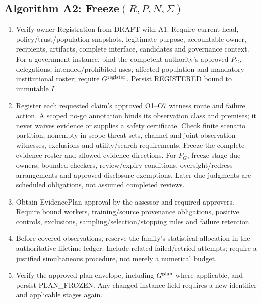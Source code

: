 \subsection{Algorithm A2: Freeze$(R,P,N,\Sigma)$}
\begin{enumerate}
\item Verify owner Registration from DRAFT with A1. Require current head,
policy/trust/population snapshots, legitimate purpose, accountable owner,
recipients, artifacts, complete interface, candidates and governance context.
For a government instance, bind the competent authority's approved $P_G$,
delegations, intended/prohibited uses, affected population and mandatory
institutional roster; require $G^{\rm register}$.
Persist REGISTERED bound to immutable $I$.
\item Register each requested claim's approved O1--O7 witness route and failure
action. A scoped no-go annotation binds its observation class and premises;
it never waives evidence or supplies a safety certificate.
Check finite scenario partition, nonempty in-scope threat sets, channel
and joint-observation witnesses, exclusions and utility/search requirements.
Freeze the complete evidence roster and allowed evidence directions.
For $P_G$, freeze stage-due owners, bounded checkers, review/expiry conditions,
oversight/redress arrangements and approved disclosure exemptions. Later-due
judgments are scheduled obligations, not assumed completed reviews.
\item Obtain EvidencePlan approval by the assessor and required approvers.
Require bound workers, training/source provenance obligations, positive
controls, exclusions, sampling/selection/stopping rules and failure retention.
\item Before covered observations, reserve the family's statistical allocation
in the authoritative lifetime ledger. Include related failed/retried attempts;
require a justified simultaneous procedure, not merely a numerical budget.
\item Verify the approved plan envelope, including $G^{\rm plan}$ where
applicable, and persist PLAN\_FROZEN. Any changed
instance field requires a new identifier and applicable stages again.
\end{enumerate}

